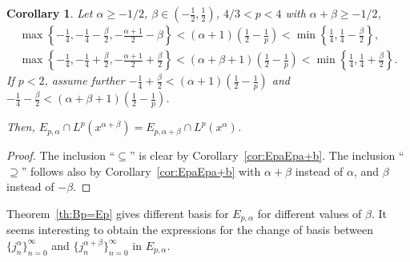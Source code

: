 \documentclass[reqno]{amsart}
\theoremstyle{plain}
\newtheorem{Cor}[Thm]{Corollary} %
\theoremstyle{definition}
\theoremstyle{remark}
\begin{document}
\begin{Cor}
Let $\alpha\ge-1/2$, $\beta\in(-\frac12,\frac12)$, $4/3 < p < 4$ with
$\alpha+\beta\ge-1/2$,
\begin{gather*}
   \max\left\{ -\frac14, -\frac14 - \frac\beta2, - \frac{\alpha+1}2 - \beta
       \right\}
   < (\alpha+1) \left(\frac12 - \frac1p \right) <
   \min\left\{ \frac14, \frac14 - \frac\beta2 \right\},
   \\
   \max\left\{
   -\frac14, -\frac14 + \frac\beta2, - \frac{\alpha+1}2 + \frac\beta2
       \right\}
   < (\alpha+\beta+1) \left(\frac12 - \frac1p \right) <
   \min\left\{ \frac14, \frac14 + \frac\beta2 \right\}.
\end{gather*}
If $p<2$, assume further $-\frac14 + \frac\beta2 <
(\alpha+1) \left(\frac12 - \frac1p \right)$ and $-\frac14 - \frac\beta2 <
(\alpha+\beta+1) \left(\frac12 - \frac1p \right)$.

Then, $E_{p,\alpha} \cap L^p(x^{\alpha+\beta}) = E_{p,\alpha+\beta} \cap
L^p(x^\alpha)$.
\end{Cor}

\begin{proof}
The inclusion ``$\subseteq$'' is clear by Corollary~\ref{cor:EpaEpa+b}.
The inclusion ``$\supseteq$'' follows also by Corollary~\ref{cor:EpaEpa+b} with
$\alpha+\beta$ instead of $\alpha$, and $\beta$ instead of $-\beta$.
\end{proof}

Theorem~\ref{th:Bp=Ep} gives different basis for $E_{p,\alpha}$ for different
values of $\beta$. It seems interesting to obtain the expressions for the
change of basis between $\{j_n^\alpha\}_{n=0}^\infty$ and
$\{j_n^{\alpha+\beta}\}_{n=0}^\infty$ in $E_{p,\alpha}$.
\end{document}
